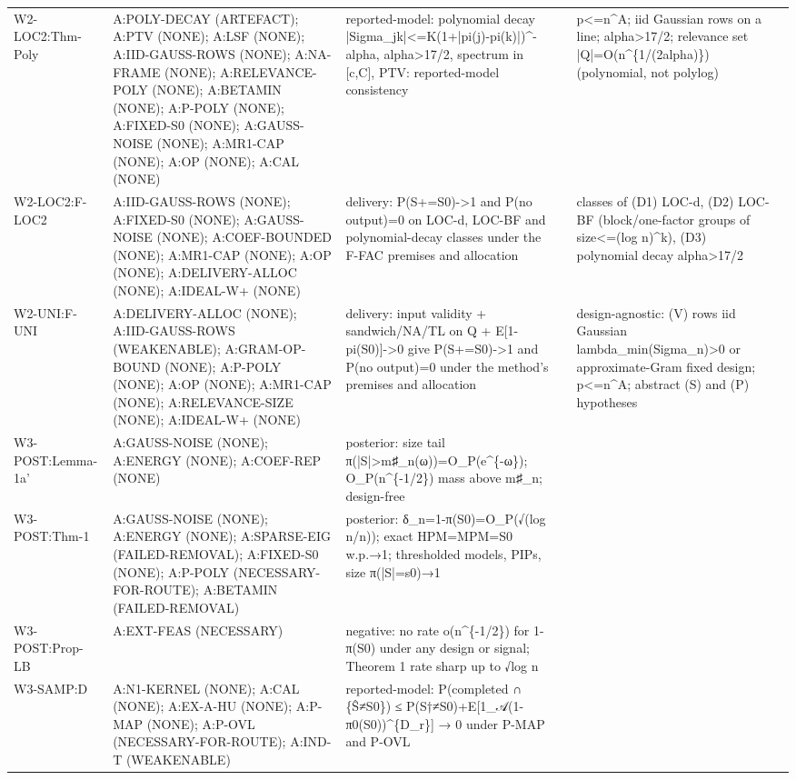 \begin{longtable}{p{2.2cm}p{4.2cm}p{3cm}p{1.6cm}p{2.6cm}p{1.6cm}}
W2-LOC2:Thm-Poly & A:POLY-DECAY (ARTEFACT); A:PTV (NONE); A:LSF (NONE); A:IID-GAUSS-ROWS (NONE); A:NA-FRAME (NONE); A:RELEVANCE-POLY (NONE); A:BETAMIN (NONE); A:P-POLY (NONE); A:FIXED-S0 (NONE); A:GAUSS-NOISE (NONE); A:MR1-CAP (NONE); A:OP (NONE); A:CAL (NONE) & reported-model: polynomial decay |Sigma\_jk|<=K(1+|pi(j)-pi(k)|)\^{}-alpha, alpha>17/2, spectrum in [c,C], PTV: reported-model consistency &  & p<=n\^{}A; iid Gaussian rows on a line; alpha>17/2; relevance set |Q|=O(n\^{}\{1/(2alpha)\}) (polynomial, not polylog) &  \\
W2-LOC2:F-LOC2 & A:IID-GAUSS-ROWS (NONE); A:FIXED-S0 (NONE); A:GAUSS-NOISE (NONE); A:COEF-BOUNDED (NONE); A:MR1-CAP (NONE); A:OP (NONE); A:DELIVERY-ALLOC (NONE); A:IDEAL-W+ (NONE) & delivery: P(S+=S0)->1 and P(no output)=0 on LOC-d, LOC-BF and polynomial-decay classes under the F-FAC premises and allocation &  & classes of (D1) LOC-d, (D2) LOC-BF (block/one-factor groups of size<=(log n)\^{}k), (D3) polynomial decay alpha>17/2 &  \\
W2-UNI:F-UNI & A:DELIVERY-ALLOC (NONE); A:IID-GAUSS-ROWS (WEAKENABLE); A:GRAM-OP-BOUND (NONE); A:P-POLY (NONE); A:OP (NONE); A:MR1-CAP (NONE); A:RELEVANCE-SIZE (NONE); A:IDEAL-W+ (NONE) & delivery: input validity + sandwich/NA/TL on Q + E[1-pi(S0)]->0 give P(S+=S0)->1 and P(no output)=0 under the method's premises and allocation &  & design-agnostic: (V) rows iid Gaussian lambda\_min(Sigma\_n)>0 or approximate-Gram fixed design; p<=n\^{}A; abstract (S) and (P) hypotheses &  \\
W3-POST:Lemma-1a' & A:GAUSS-NOISE (NONE); A:ENERGY (NONE); A:COEF-REP (NONE) & posterior: size tail π(|S|>m♯\_n(ω))=O\_P(e\^{}\{-ω\}); O\_P(n\^{}\{-1/2\}) mass above m♯\_n; design-free &  &  &  \\
W3-POST:Thm-1 & A:GAUSS-NOISE (NONE); A:ENERGY (NONE); A:SPARSE-EIG (FAILED-REMOVAL); A:FIXED-S0 (NONE); A:P-POLY (NECESSARY-FOR-ROUTE); A:BETAMIN (FAILED-REMOVAL) & posterior: δ\_n=1-π(S0)=O\_P(√(log n/n)); exact HPM=MPM=S0 w.p.→1; thresholded models, PIPs, size π(|S|=s0)→1 &  &  &  \\
W3-POST:Prop-LB & A:EXT-FEAS (NECESSARY) & negative: no rate o(n\^{}\{-1/2\}) for 1-π(S0) under any design or signal; Theorem 1 rate sharp up to √log n &  &  &  \\
W3-SAMP:D & A:N1-KERNEL (NONE); A:CAL (NONE); A:EX-A-HU (NONE); A:P-MAP (NONE); A:P-OVL (NECESSARY-FOR-ROUTE); A:IND-T (WEAKENABLE) & reported-model: P(completed ∩ \{Ŝ≠S0\}) ≤ P(S†≠S0)+E[1\_𝒜(1-π0(S0))\^{}\{D\_r\}] → 0 under P-MAP and P-OVL &  &  &  \\

\end{longtable}
